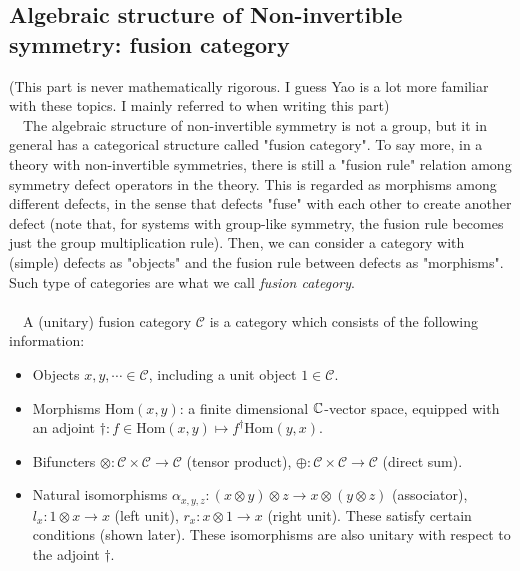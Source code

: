 \documentclass{ltjsarticle}
\theoremstyle{mystyle} %
\numberwithin{equation}{section}
\begin{document}
\subsection{Algebraic structure of Non-invertible symmetry: fusion category}
\noindent
\tiny
(This part is never mathematically rigorous. I guess Yao is a lot more familiar with these topics. 
I mainly referred to \cite{KI} when writing this part)\\
\normalsize
　The algebraic structure of non-invertible symmetry is not a group, but it in general has a categorical structure called "fusion category". 
To say more, in a theory with non-invertible symmetries, there is still a "fusion rule" relation among symmetry defect operators in the theory. 
This is regarded as morphisms among different defects, in the sense that defects "fuse" with each other to create another defect 
(note that, for systems with group-like symmetry, the fusion rule becomes just the group multiplication rule). 
Then, we can consider a category with (simple) defects as "objects" and the fusion rule between defects as "morphisms". 
Such type of categories are what we call \textit{fusion category}. \\
\\
　A (unitary) fusion category $\mathcal{C}$ is a category which consists of the following information:
\begin{itemize}
    \item Objects $x, y, \cdots \in \mathcal{C}$, including a unit object $1\in \mathcal{C}$. 
    \item Morphisms $\mathrm{Hom}(x,y)$: a finite dimensional $\mathbb{C}$-vector space, 
    equipped with an adjoint $\dagger: f\in \mathrm{Hom}(x,y)\mapsto f^\dagger \mathrm{Hom}(y,x)$. 
    \item Bifuncters $\otimes: \mathcal{C}\times \mathcal{C}\to \mathcal{C}$ (tensor product), $\oplus: \mathcal{C}\times \mathcal{C}\to \mathcal{C}$ (direct sum).  
    \item Natural isomorphisms $\alpha_{x,y,z}: (x\otimes y)\otimes z\to x\otimes (y\otimes z)$ (associator), $l_x: 1\otimes x\to x$ (left unit), $r_x: x\otimes 1\to x$ (right unit). 
    These satisfy certain conditions (shown later). These isomorphisms are also unitary with respect to the adjoint $\dagger$. 
\end{itemize}
\end{document}
